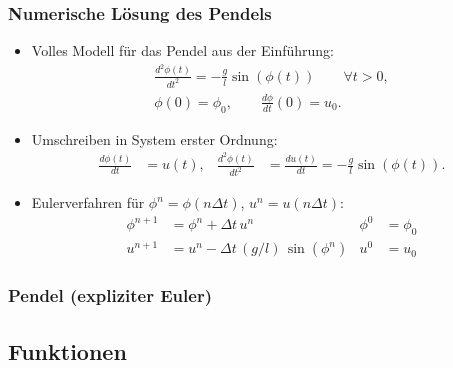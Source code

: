 \documentclass[ignorenonframetext,12pt]{beamer}
\theoremstyle{definition}
\theoremstyle{definition}
\begin{document}
\begin{frame}[fragile]
\frametitle{Numerische Lösung des Pendels}
\begin{itemize}
\item Volles Modell für das Pendel aus der Einführung:
  \begin{gather*}
    \frac{d^2\phi(t)}{d t^2} = - \frac{g}{l} \sin(\phi(t)) \qquad \forall t>0,\\
    \phi(0) = \phi_0, \qquad \frac{d \phi}{d t}(0) = u_0.
  \end{gather*}
\item Umschreiben in System erster Ordnung:
  \begin{align*}
    \frac{d\phi(t)}{d t} &= u(t), & \frac{d^2\phi(t)}{d t^2} &=
    \frac{d u(t)}{d t} = - \frac{g}{l} \sin(\phi(t)).
  \end{align*}
\item Eulerverfahren für $\phi^n = \phi(n\Delta t)$, $u^n = u(n\Delta t)$:
  \begin{align*}
    \phi^{n+1} &= \phi^n + \Delta t \, u^n & \phi^0 &= \phi_0\\
    u^{n+1} &= u^n -\Delta t \, (g/l) \, \sin(\phi^n) & u^0 &= u_0
  \end{align*}
\end{itemize}
\end{frame}

\begin{frame}[fragile]
\frametitle{Pendel (expliziter Euler)}

\end{frame}

\subsection{Funktionen}
\end{document}
